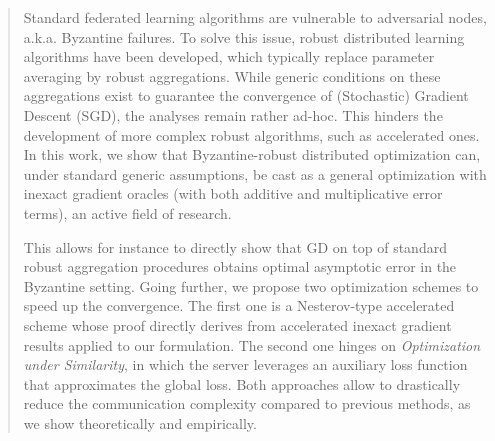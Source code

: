 \documentclass{article}
\theoremstyle{plain}
\theoremstyle{definition}
\theoremstyle{remark}
\begin{document}



\printAffiliationsAndNotice{}  %

\begin{abstract}
Standard federated learning algorithms are vulnerable to adversarial nodes, a.k.a. Byzantine failures. To solve this issue, robust distributed learning algorithms have been developed, which typically replace parameter averaging by robust aggregations. While generic conditions on these aggregations exist to guarantee the convergence of (Stochastic) Gradient Descent (SGD), the analyses remain rather ad-hoc. This hinders the development of more complex robust algorithms, such as accelerated ones.
In this work, we show that Byzantine-robust distributed optimization can, under standard generic assumptions, be cast as a general optimization with inexact gradient oracles (with both additive and multiplicative error terms), an active field of research. 

This allows for instance to directly show that GD on top of standard robust aggregation procedures obtains optimal asymptotic error in the Byzantine setting.
Going further, we propose two optimization schemes to speed up the convergence. The first one is a Nesterov-type accelerated scheme whose proof directly derives from accelerated inexact gradient results applied to our formulation. 
The second one hinges on \emph{Optimization under Similarity}, in which the server leverages an auxiliary loss function that  approximates the global loss.
Both approaches allow to drastically reduce the communication complexity compared to previous methods, as we show theoretically and empirically.
\end{abstract}
\end{document}
